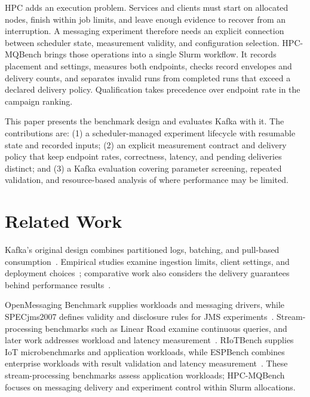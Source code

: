\documentclass[10pt]{article}
\newcommand{\system}{HPC-MQBench}
\begin{document}
HPC adds an execution problem.  Services and clients must start on allocated
nodes, finish within job limits, and leave enough evidence to recover from an
interruption.  A messaging experiment therefore needs an explicit connection
between scheduler state, measurement validity, and configuration selection.
\system{} brings those operations into a single Slurm workflow.
It records placement and settings, measures both endpoints, checks record
envelopes and delivery counts, and separates invalid runs from completed runs
that exceed a declared delivery
policy.  Qualification takes precedence over endpoint rate in the campaign ranking.

This paper presents the benchmark design and evaluates Kafka with it.  The
contributions are: (1) a scheduler-managed experiment lifecycle with resumable
state and recorded inputs; (2) an explicit measurement contract and delivery policy that keep
endpoint rates, correctness, latency, and pending deliveries distinct; and (3) a Kafka
evaluation covering parameter screening, repeated validation, and resource-based
analysis of where performance may be limited.

\section{Related Work}
\label{sec:related-work}

Kafka's original design combines partitioned logs, batching, and pull-based
consumption~\cite{kreps2011kafka}.  Empirical studies examine ingestion limits,
client settings, and deployment choices~\cite{hesse2020kafka,fu2021fair};
comparative work also considers the delivery guarantees behind performance
results~\cite{dobbelaere2017kafka}.

OpenMessaging Benchmark supplies workloads and messaging drivers, while
SPECjms2007 defines validity and disclosure rules for JMS
experiments~\cite{openmessagingbenchmark,specjms2007}.  Stream-processing
benchmarks such as Linear Road examine continuous queries, and later work
addresses workload and latency measurement~\cite{arasu2004linearroad,karimov2018streambench}.
RIoTBench supplies IoT microbenchmarks and application workloads, while ESPBench
combines enterprise workloads with result validation and latency
measurement~\cite{shukla2017riotbench,hesse2021espbench}.  These stream-processing
benchmarks assess application workloads; \system{} focuses on messaging
delivery and experiment control within Slurm allocations.
\end{document}
